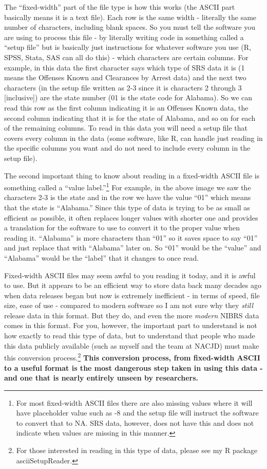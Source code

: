 \documentclass[
]{krantz}
\begin{document}
The ``fixed-width'' part of the file type is how this works
(the ASCII part basically means it is a text file). Each row
is the same width - literally the same number of characters,
including blank spaces. So you must tell the software you
are using to process this file - by literally writing code
in something called a ``setup file'' but is basically just
instructions for whatever software you use (R, SPSS, Stata,
SAS can all do this) - which characters are certain columns.
For example, in this data the first character says which
type of SRS data it is (1 means the Offenses Known and
Clearances by Arrest data) and the next two characters (in
the setup file written as 2-3 since it is characters 2
through 3 {[}inclusive{]}) are the state number (01 is the
state code for Alabama). So we can read this row as the
first column indicating it is an Offenses Known data, the
second column indicating that it is for the state of
Alabama, and so on for each of the remaining columns. To
read in this data you will need a setup file that covers
every column in the data (some software, like R, can handle
just reading in the specific columns you want and do not
need to include every column in the setup file).

The second important thing to know about reading in a
fixed-width ASCII file is something called a ``value
label.''\footnote{For most fixed-width ASCII files there are
  also missing values where it will have placeholder value
  such as -8 and the setup file will instruct the software
  to convert that to NA. SRS data, however, does not have
  this and does not indicate when values are missing in this
  manner.} For example, in the above image we saw the
characters 2-3 is the state and in the row we have the value
``01'' which means that the state is ``Alabama.'' Since this
type of data is trying to be as small as efficient as
possible, it often replaces longer values with shorter one
and provides a translation for the software to use to
convert it to the proper value when reading it. ``Alabama''
is more characters than ``01'' so it saves space to say
``01'' and just replace that with ``Alabama'' later on. So
``01'' would be the ``value'' and ``Alabama'' would be the
``label'' that it changes to once read.

Fixed-width ASCII files may seem awful to you reading it
today, and it is awful to use. But it appears to be an
efficient way to store data back many decades ago when data
releases began but now is extremely inefficient - in terms
of speed, file size, ease of use - compared to modern
software so I am not sure why they \emph{still} release data
in this format. But they do, and even the more \emph{modern}
NIBRS data comes in this format. For you, however, the
important part to understand is not how exactly to read this
type of data, but to understand that people who made this
data publicly available (such as myself and the team at
NACJD) must make this conversion process.\footnote{For those
  interested in reading in this type of data, please see my
  R package asciiSetupReader.} \textbf{This conversion
process, from fixed-width ASCII to a useful format is the
most dangerous step taken in using this data - and one that
is nearly entirely unseen by researchers.}
\end{document}
